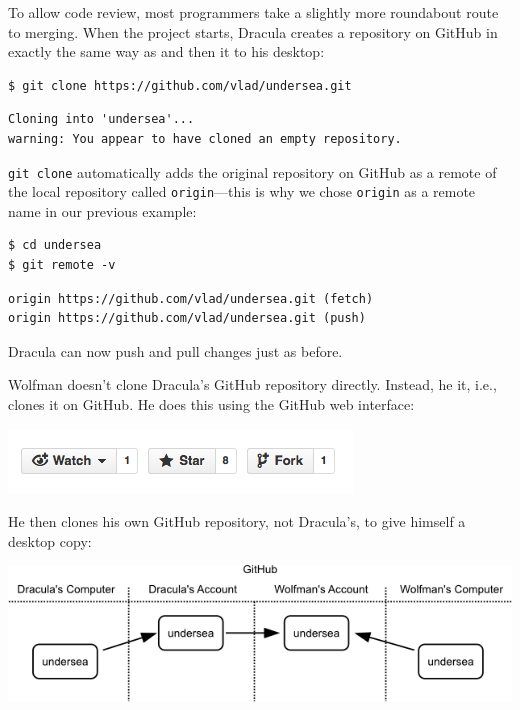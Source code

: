 \documentclass{book}
\begin{document}
To allow code review, most programmers take a slightly more roundabout
route to merging. When the project starts, Dracula creates a repository
on GitHub in exactly the same way as  and then
 it to his desktop:

\begin{verbatim}
$ git clone https://github.com/vlad/undersea.git
\end{verbatim}

\begin{verbatim}
Cloning into 'undersea'...
warning: You appear to have cloned an empty repository.
\end{verbatim}

\texttt{git clone} automatically adds the original repository on GitHub
as a remote of the local repository called \texttt{origin}---this is why
we chose \texttt{origin} as a remote name in our previous example:

\begin{verbatim}
$ cd undersea
$ git remote -v
\end{verbatim}

\begin{verbatim}
origin https://github.com/vlad/undersea.git (fetch)
origin https://github.com/vlad/undersea.git (push)
\end{verbatim}

Dracula can now push and pull changes just as before.

Wolfman doesn't clone Dracula's GitHub repository directly. Instead, he
 it, i.e., clones it on GitHub. He
does this using the GitHub web interface:

\includegraphics{novice/extras/img/git-fork-ui.png}

He then clones his own GitHub repository, not Dracula's, to give himself
a desktop copy:

\includegraphics{novice/extras/img/git-forking-01.png}
\end{document}
